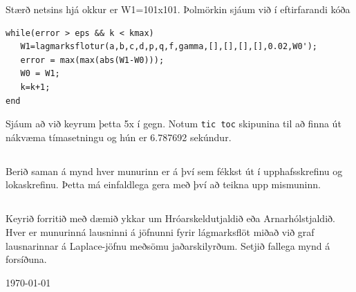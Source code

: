 \documentclass[11pt,a4paper,titlepage]{article}
\begin{document}
Stærð netsins hjá okkur er W1=101x101.  Þolmörkin sjáum við í eftirfarandi kóða
\begin{verbatim}
while(error > eps && k < kmax)
   W1=lagmarksflotur(a,b,c,d,p,q,f,gamma,[],[],[],[],0.02,W0');
   error = max(max(abs(W1-W0)));
   W0 = W1;
   k=k+1;
end
\end{verbatim} 
Sjáum að við keyrum þetta 5x í gegn. Notum \verb|tic toc| skipunina til að finna út nákvæma tímasetningu og hún er 6.787692 sekúndur.

\subsection{}
Berið saman á mynd hver munurinn er á því sem fékkst út í upphafsskrefinu og lokaskrefinu. Þetta má einfaldlega gera með því að teikna upp mismuninn.

\subsection{}
Keyrið forritið með dæmið ykkar um Hróarskeldutjaldið eða Arnarhólstjaldið. Hver er munurinná lausninni á jöfnunni fyrir lágmarksflöt miðað við graf lausnarinnar á Laplace-jöfnu meðsömu jaðarskilyrðum. Setjið fallega mynd á forsíðuna.
 
 
\newpage
\begin{flushright}
 \today
\end{flushright}
\end{document}
